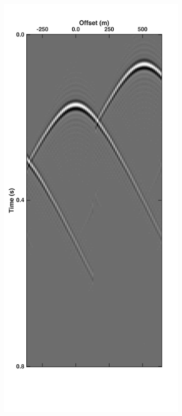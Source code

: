 \begin{figure}
	\centering
	\begin{subfigure}[b]{0.3\textwidth}
		\centering
		\includegraphics[width = \textwidth]{Plots/Mahdad/25iter/TimeDelay/Pseudo-DeblendedCRG_rec30_coh}

\end{subfigure}
\end{figure}
